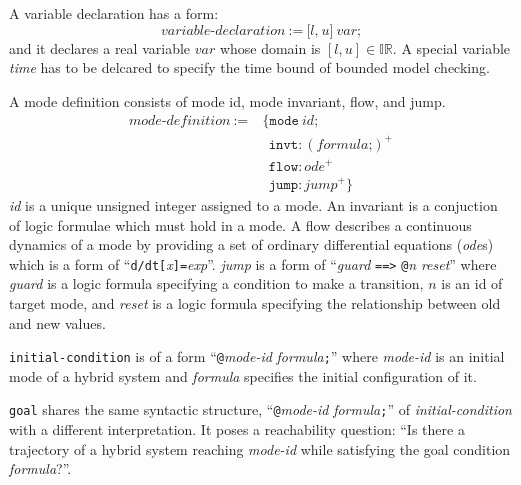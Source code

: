 A variable declaration has a form:
\[
\textit{variable-declaration} \ := \ \texttt{[}
                                     \textit{l}
                                     \texttt{,}
                                     \ \textit{u}
                                     \texttt{]}
                                     \ \textit{var}
                                     \texttt{;}
\]
and it declares a real variable $var$ whose domain is $[l, u] \in
\mathbb{IR}$. A special variable \textit{time} has to be delcared to
specify the time bound of bounded model checking.

A mode definition consists of mode id, mode invariant, flow, and jump.
\begin{align*}
  \textit{mode-definition} \ := & \ \texttt{\{}
                                    \texttt{mode} \ \textit{id}\texttt{;}\\
                           & \ \ \  \texttt{invt}:(\textit{formula} \texttt{;})^+\\
                           & \ \ \  \texttt{flow}:\textit{ode}^+\\
                           & \ \ \ \texttt{jump}:\textit{jump}^+ \texttt{\}}
\end{align*}
\textit{id} is a unique unsigned integer assigned to a mode. An
invariant is a conjuction of logic formulae which must hold in a mode.
A flow describes a continuous dynamics of a mode by providing a set of
ordinary differential equations (\textit{ode}s) which is a form of
``\texttt{d/dt[}\textit{x}\texttt{]=}\textit{exp}''. \textit{jump} is
a form of ``\textit{guard} \texttt{==>} \texttt{@}\textit{n}
\textit{reset}'' where \textit{guard} is a logic formula specifying a
condition to make a transition, $n$ is an id of target mode, and
\textit{reset} is a logic formula specifying the relationship between
old and new values.

\texttt{initial-condition} is of a form
``\texttt{@}\textit{mode-id} \textit{formula}\texttt{;}''
where \textit{mode-id} is an initial mode of a hybrid system and
\textit{formula} specifies the initial configuration of it.

\texttt{goal} shares the same syntactic structure,
``\texttt{@}\textit{mode-id} \textit{formula}\texttt{;}'' of
\textit{initial-condition} with a different interpretation. It poses a
reachability question: ``Is there a trajectory of a hybrid system
reaching \textit{mode-id} while satisfying the goal condition \textit{formula}?''.


